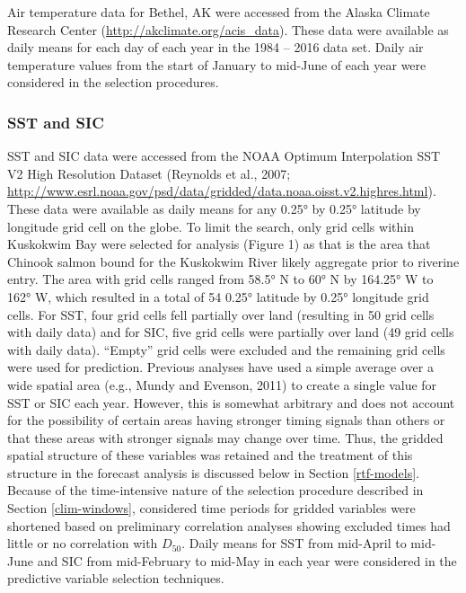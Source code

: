 \documentclass[12pt,]{book}
\theoremstyle{definition}
\theoremstyle{definition}
\theoremstyle{definition}
\theoremstyle{remark}
\begin{document}
Air temperature data for Bethel, AK were accessed from the Alaska
Climate Research Center (\url{http://akclimate.org/acis_data}). These
data were available as daily means for each day of each year in the 1984
-- 2016 data set. Daily air temperature values from the start of January
to mid-June of each year were considered in the selection procedures.

\subsubsection{SST and SIC}\label{sst-and-sic}

SST and SIC data were accessed from the NOAA Optimum Interpolation SST
V2 High Resolution Dataset (Reynolds et al., 2007;
\url{http://www.esrl.noaa.gov/psd/data/gridded/data.noaa.oisst.v2.highres.html}).
These data were available as daily means for any 0.25° by 0.25° latitude
by longitude grid cell on the globe. To limit the search, only grid
cells within Kuskokwim Bay were selected for analysis (Figure 1) as that
is the area that Chinook salmon bound for the Kuskokwim River likely
aggregate prior to riverine entry. The area with grid cells ranged from
58.5° N to 60° N by 164.25° W to 162° W, which resulted in a total of 54
0.25° latitude by 0.25° longitude grid cells. For SST, four grid cells
fell partially over land (resulting in 50 grid cells with daily data)
and for SIC, five grid cells were partially over land (49 grid cells
with daily data). ``Empty'' grid cells were excluded and the remaining
grid cells were used for prediction. Previous analyses have used a
simple average over a wide spatial area (e.g., Mundy and Evenson, 2011)
to create a single value for SST or SIC each year. However, this is
somewhat arbitrary and does not account for the possibility of certain
areas having stronger timing signals than others or that these areas
with stronger signals may change over time. Thus, the gridded spatial
structure of these variables was retained and the treatment of this
structure in the forecast analysis is discussed below in Section
\ref{rtf-models}. Because of the time-intensive nature of the selection
procedure described in Section \ref{clim-windows}, considered time
periods for gridded variables were shortened based on preliminary
correlation analyses showing excluded times had little or no correlation
with \(D_{50}\). Daily means for SST from mid-April to mid-June and SIC
from mid-February to mid-May in each year were considered in the
predictive variable selection techniques.
\end{document}
